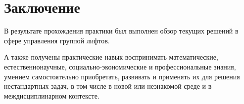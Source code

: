 \newpage
\section{Заключение}
	В результате прохождения практики был выполнен обзор текущих решений в сфере управления группой лифтов.

	А также получены практические навык воспринимать математические, естественнонаучные, социально-экономические и профессиональные знания, умением самостоятельно приобретать, развивать и применять их для решения нестандартных задач, в том числе в новой или незнакомой среде и в междисциплинарном контексте.
